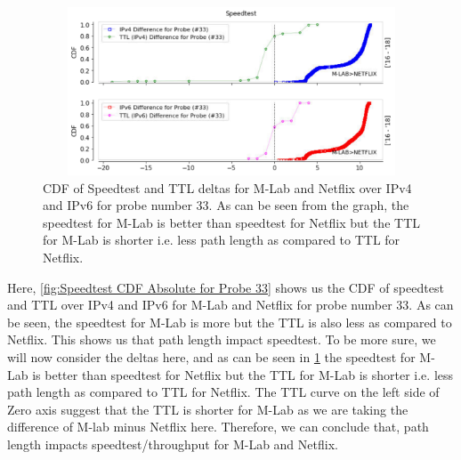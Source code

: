 \begin{figure}[!ht]
	\centering
	\includegraphics[keepaspectratio, height=5cm, width=15cm]{figures/mlab/ttl-speedtest-cdf-probe-33.pdf}
	\caption[Speedtest CDF delta for Probe 33]{CDF of Speedtest and TTL deltas for M-Lab and Netflix over IPv4 and IPv6 for probe number 33. As can be seen from the graph, the speedtest for M-Lab is better than speedtest for Netflix
but the TTL for M-Lab is shorter i.e. less path length as compared to TTL for Netflix.}
	\label{fig:Speedtest CDF Delta for Probe 33}
\end{figure}

Here, \cref{fig:Speedtest CDF Absolute for Probe 33} shows us the CDF of speedtest and TTL over IPv4 and IPv6 for M-Lab and Netflix for probe number 33. As can be seen, the speedtest for M-Lab is more but the TTL is also less as compared to Netflix. This shows us
that path length impact speedtest. To be more sure, we will now consider the deltas here, and as can be seen in \cref{fig:Speedtest CDF Delta for Probe 33} the speedtest for M-Lab is better than speedtest for Netflix
but the TTL for M-Lab is shorter i.e. less path length as compared to TTL for Netflix. The TTL curve on the left side of Zero axis suggest that the TTL is shorter for M-Lab as we are taking the difference of M-lab minus Netflix here.
Therefore, we can conclude that, path length impacts speedtest/throughput for M-Lab and Netflix.